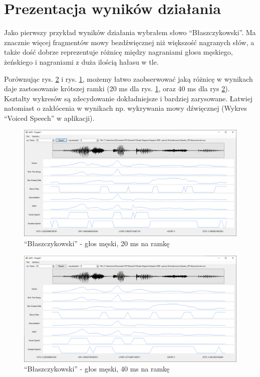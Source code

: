 \documentclass[12pt,a4paper]{article}
\begin{document}
\section{Prezentacja wyników działania\label{sec:prezentacja}}
Jako pierwszy przykład wyników działania wybrałem słowo ``Błaszczykowski''. Ma znacznie więcej
fragmentów mowy bezdźwięcznej niż większość nagranych słów, a także dość dobrze reprezentuje różnicę
między nagraniami głosu męskiego, żeńskiego i nagraniami z duża ilością hałasu w tle.

Porównując rys. \ref{fig:blaszczykowski_m} i rys. \ref{fig:blaszczykowski_m_20}, możemy łatwo
zaobserwować jaką różnicę w wynikach daje zastosowanie krótszej ramki (20 ms dla rys.
\ref{fig:blaszczykowski_m_20}, oraz 40 ms dla rys \ref{fig:blaszczykowski_m}). Kształty wykresów są
zdecydowanie dokładniejsze i bardziej zarysowane. Łatwiej natomiast o zakłócenia w wynikach np.
wykrywania mowy dźwięcznej (Wykres ``Voiced Speech'' w aplikacji).

\begin{figure}[h!]
\centering
\includegraphics[width=1.0\textwidth]{figures/blaszczykowski_m_20}
\caption{``Błaszczykowski'' - głos męski, 20 ms na ramkę}
\label{fig:blaszczykowski_m_20}
\end{figure}

\begin{figure}[h!]
\centering
\includegraphics[width=1.0\textwidth]{figures/blasczykowski_m}
\caption{``Błaszczykowski'' - głos męski, 40 ms na ramkę}
\label{fig:blaszczykowski_m}
\end{figure}
\end{document}
